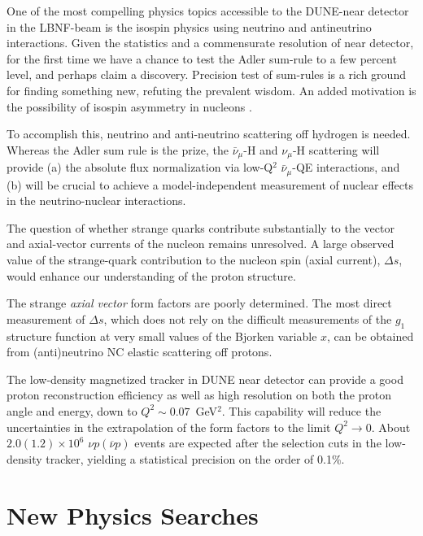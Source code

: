 {%
One of the most compelling physics topics 
accessible to the DUNE-near detector in the LBNF-beam is the isospin physics 
using neutrino and antineutrino interactions. Given the statistics and a commensurate 
resolution of near detector, for the first time we have a chance to test the Adler sum-rule to a 
few percent level, and perhaps claim a discovery. 
Precision test of sum-rules is a rich ground for finding something new, refuting the prevalent wisdom. 
An added motivation is the possibility of isospin asymmetry in nucleons . 

To accomplish this, neutrino and anti-neutrino scattering off hydrogen is needed. 
Whereas the Adler sum rule is the prize, the $\bar \nu_\mu$-H and $\nu_\mu$-H scattering
will provide (a)  the 
absolute flux normalization via low-Q$^2$ $\bar \nu_\mu$-QE interactions,  
and (b) will be crucial to achieve a model-independent measurement of nuclear effects in the 
neutrino-nuclear interactions. 

The question of whether strange
  quarks contribute substantially to the vector and axial-vector
  currents of the nucleon remains unresolved. A large observed value of the
  strange-quark contribution to the nucleon spin (axial current),
  $\Delta s$, would enhance our understanding of the proton structure.

The strange \emph{axial vector} form factors are poorly 
determined. The most direct measurement of $\Delta s$, which does not rely on the difficult
measurements of the $g_1$ structure function at very small values of the Bjorken variable $x$, 
can be obtained from (anti)neutrino NC elastic scattering off protons.  %

The low-density magnetized tracker in DUNE near detector can provide a good proton reconstruction efficiency as well as
high resolution on both the proton angle and energy, down to $Q^2\sim0.07$~GeV$^2$. 
This capability will reduce the uncertainties in the extrapolation of the form factors to the limit
$Q^2 \to 0$. About $2.0 (1.2) \times 10^6$ $\nu p
(\overline{\nu} p)$ events are expected after the selection cuts in
the low-density tracker, yielding a statistical precision on the order
of 0.1\%.


\section{New Physics Searches} 
\label{sec-nd-np} 

}

